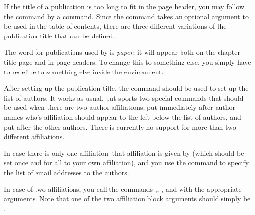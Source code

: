 If the title of a publication is too long to fit in the page header, you may follow the  command by a  command.  Since the  command takes an optional argument to be used in the table of contents, there are three different variations of the publication title that can be defined.

The word for publications used by \rtthesis is \emph{paper}; it will appear both on the chapter title page and in page headers.  To change this to something else, you simply have to redefine  to something else inside the  environment.

After setting up the publication title, the  command should be used to set up the list of authors.  It works as usual, but sports two special \rtthesis commands that should be used when there are two author affiliations;  put  immediately after author names who's affiliation should appear to the left below the list of authors, and put  after the other authors.  There is currently no support for more than two different affiliations.

In case there is only one affiliation, that affiliation is given by  (which should be set once and for all to your own affiliation), and you use the  command to specify the list of email addresses to the authors.

In case of two affiliations, you call the commands  ,, , and  with the appropriate arguments.  Note that one of the two affiliation block arguments should simply be .

